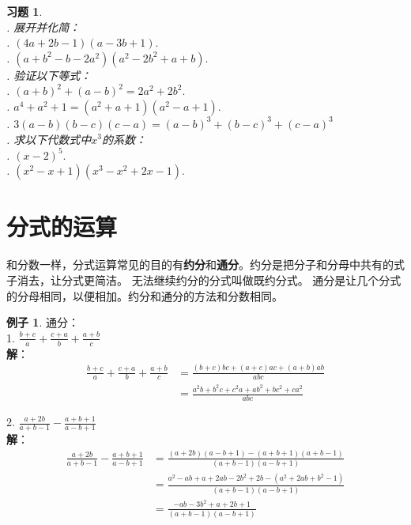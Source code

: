 \documentclass[12pt,UTF8]{ctexbook}
\theoremstyle{definition}
\newtheorem{ex}{例子}[section]
\theoremstyle{plain}
\newtheorem{xt}{习题}[section]
\begin{document}
\begin{xt}\label{xt:5-0-0}
    \mbox{}\\
    . 展开并化简：\\
    . $(4a + 2b - 1)(a - 3b + 1).$\\  %
    . $(a + b^2 - b - 2a^2)(a^2 - 2b^2 + a + b).$\\  %
    . 验证以下等式：\\
    . $(a + b)^2 + (a - b)^2 = 2a^2+2b^2.$\\
    . $a^4 + a^2 + 1 = (a^2+a+1)(a^2-a+1).$\\
    . $3(a-b)(b-c)(c-a) = (a-b)^3+(b-c)^3+(c-a)^3$\\
    . 求以下代数式中$x^3$的系数：\\
    . $(x - 2)^5.$\\
    . $(x^2 - x + 1)(x^3 - x^2 +2x - 1).$
\end{xt}

\section{分式的运算}

和分数一样，分式运算常见的目的有\textbf{约分}和\textbf{通分}。约分是把分子和分母中共有的式子消去，让分式更简洁。
无法继续约分的分式叫做既约分式。
通分是让几个分式的分母相同，以便相加。约分和通分的方法和分数相同。

\begin{ex}\label{ex:5-1-0}
    通分：\\
    1. $\frac{b+c}{a} + \frac{c+a}{b} + \frac{a+b}{c}$\\
    \textbf{解}：
    \begin{align*}
        \frac{b+c}{a} + \frac{c+a}{b} + \frac{a+b}{c} &= \frac{(b+c)bc+(a+c)ac+(a+b)ab}{abc} \\
        &= \frac{ a^2b+b^2c+c^2a + ab^2+bc^2+ca^2}{abc} 
    \end{align*}

    2. $\frac{a+2b}{a+b-1} - \frac{a+b+1}{a-b+1}$\\
    \textbf{解}：
    \begin{align*}
        \frac{a+2b}{a+b-1} - \frac{a+b+1}{a-b+1} &= \frac{(a+2b)(a-b+1) - (a+b+1)(a+b-1)}{(a+b-1)(a-b+1)} \\
        &=  \frac{a^2-ab+a+2ab-2b^2+2b - (a^2+2ab+b^2-1)}{(a+b-1)(a-b+1)}  \\
        &= \frac{-ab-3b^2+a+2b+1}{(a+b-1)(a-b+1)} 
    \end{align*}
\end{ex}
\end{document}

